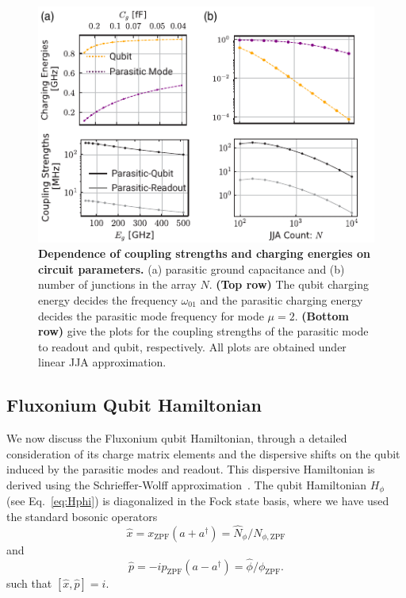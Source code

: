 \documentclass[%
reprint,
superscriptaddress,
 amsmath,amssymb,
 aps,
 prx,
longbibliography,
floatfix,
]{revtex4-2}
\newcommand{\sh}[1]{{\color{blue}{{}[SS: #1]}}}%
\begin{document}
\begin{figure}[htb]
    \centering
    \includegraphics[width=\linewidth]{Supp_Fig/Circuit_comp.pdf}
    \caption{{\bf Dependence of coupling strengths and charging energies on circuit parameters.} (a) parasitic ground capacitance and (b) number of junctions in the array $N$. {\bf (Top row)} The qubit charging energy decides the frequency $\omega_{01}$ and the parasitic charging energy decides the parasitic mode frequency for mode $\mu=2$. {\bf (Bottom row)} give the plots for the coupling strengths of the parasitic mode to readout and qubit, respectively. All plots are obtained under linear JJA approximation.}
    \label{fig:circuit_comp}
\end{figure}

\subsection{Fluxonium Qubit Hamiltonian}
\sh{check for units to be $\hbar=1$}
We now discuss the Fluxonium qubit Hamiltonian, through a detailed consideration of its charge matrix elements and the dispersive shifts on the qubit induced by the parasitic modes and readout. This dispersive Hamiltonian is derived using the Schrieffer-Wolff approximation~\cite{viola2015collective}. The qubit Hamiltonian $H_{\phi}$ (see Eq.~\ref{eq:Hphi}) is diagonalized in the Fock state basis, where we have used the standard bosonic operators
 \begin{equation} \hat x=x_{\mathrm{ZPF}}(a+a^\dagger)=\hat N_{\phi}/ N_{\phi,\mathrm{ZPF}}
 \end{equation}
 and 
 \begin{equation} \hat p=-ip_{\mathrm{ZPF}}(a-a^\dagger)=\hat \phi/\phi_{\mathrm{ZPF}}.
 \end{equation}
such that $[\hat x,\hat p]=i$.
\end{document}

